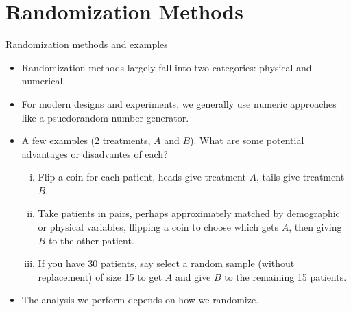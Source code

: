 \section{Randomization Methods}

\begin{frame}[allowframebreaks]{Randomization methods and examples}
  \begin{itemize}
    \item Randomization methods largely fall into two categories: physical and numerical.
    \item For modern designs and experiments, we generally use numeric approaches like a \alert{psuedorandom} number generator.
    \item A few examples (2 treatments, $A$ and $B$). What are some potential advantages or disadvantes of each?
    
    \framebreak
    
    \begin{enumerate}[(i)]
      \item Flip a coin for each patient, heads give treatment $A$, tails give treatment $B$.
      
      \vspace{1.5cm}
      
      \item Take patients in pairs, perhaps approximately matched by demographic or physical variables, flipping a coin to choose which gets $A$, then giving $B$ to the other patient.
      
      \vspace{1.5cm}
      
      \item If you have 30 patients, say select a random sample (without replacement) of size 15 to get $A$ and give $B$ to the remaining 15 patients. 
      
    \end{enumerate}
   
    \framebreak
    
    \item The analysis we perform depends on how we randomize.
    
    
  \end{itemize}
\end{frame}

